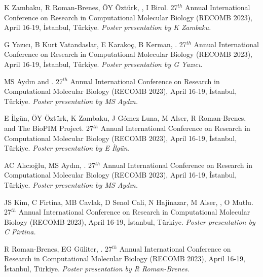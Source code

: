  K Zambaku, R Roman-Brenes, ÖY Öztürk, \calkan{}, I Birol. 27$^{th}$ Annual International Conference on Research in Computational Molecular Biology (RECOMB 2023), April 16-19, İstanbul, Türkiye. {\it Poster presentation by K Zambaku.}

\clearpage

\vspace{-.2cm}{\bf Identification of protein-protein interaction
bridges in multiple sclerosis.} G Yazıcı, B Kurt Vatandaslar, E Karakoç, B Kerman, \calkan{}.
27$^{th}$ Annual International Conference on Research in Computational Molecular Biology (RECOMB 2023), April 16-19, İstanbul, Türkiye.
{\it Poster presentation by G Yazıcı.}

\vspace{-.2cm}{\bf Whole genome alignment via Alternating Lyndon Factorization Tree traversal.} MS Aydın and \calkan{}. 27$^{th}$ Annual International Conference on Research in Computational Molecular Biology (RECOMB 2023), April 16-19, İstanbul, Türkiye. {\it Poster presentation by MS Aydın.}

\vspace{-.2cm}{\bf Characterization of alignment and search algorithms for short read, long read, and graph mappers.} E İlgün, ÖY Öztürk, K Zambaku, J Gómez Luna, M Alser, R Roman-Brenes, \calkan{} and The BioPIM Project. 27$^{th}$ Annual International Conference on Research in Computational Molecular Biology (RECOMB 2023), April 16-19, İstanbul, Türkiye. {\it Poster presentation by E İlgün.}

\vspace{-.2cm}{\bf Pairwise sequence alignment with block and character edit operations.} AC Alıcıoğlu, MS Aydın, \calkan{}. 27$^{th}$ Annual International Conference on Research in Computational Molecular Biology (RECOMB 2023), April 16-19, İstanbul, Türkiye. {\it Poster presentation by MS Aydın.}

\vspace{-.2cm}{\bf AirLift: a fast and comprehensive technique for remapping alignments between reference genomes.} JS Kim, C Firtina, MB Cavlak, D Senol Cali, N Hajinazar, M Alser, \calkan{}, O Mutlu. 27$^{th}$ Annual International Conference on Research in Computational Molecular Biology (RECOMB 2023), April 16-19, İstanbul, Türkiye. {\it Poster presentation by C Firtina.}

\vspace{-.2cm}{\bf Fast identification of sepsis antibiotic resistance.}  R Roman-Brenes, EG Güliter,  \calkan{}. 27$^{th}$ Annual International Conference on Research in Computational Molecular Biology (RECOMB 2023), April 16-19, İstanbul, Türkiye. {\it Poster presentation by R Roman-Brenes.}

